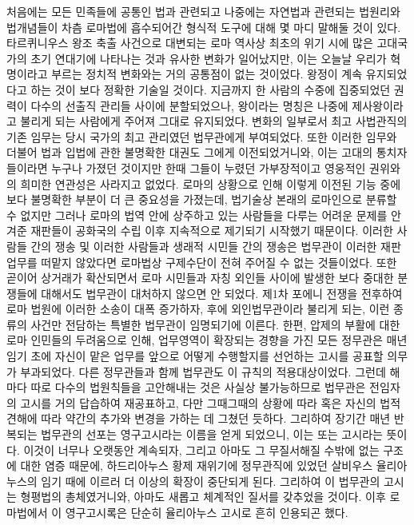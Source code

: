 처음에는 모든 민족들에 공통인 법과 관련되고 나중에는 자연법과 관련되는
법원리와 법개념들이 차츰 로마법에 흡수되어간 형식적 도구에 대해
몇 마디 말해둘 것이 있다.
타르퀴니우스 왕조 축출 사건으로 대변되는 로마 역사상 최초의 위기 시에
많은 고대국가의 초기 연대기에 나타나는 것과 유사한 변화가 일어났지만,
이는 오늘날 우리가 혁명이라고 부르는 정치적 변화와는 거의 공통점이 없는
것이었다.
왕정이 계속 유지되었다고 하는 것이 보다 정확한 기술일 것이다.
지금까지 한 사람의 수중에 집중되었던 권력이
다수의 선출직 관리들 사이에 분할되었으나,
왕이라는 명칭은 나중에
제사왕이라고
불리게 되는 사람에게 주어져 그대로 유지되었다.
변화의 일부로서 최고 사법관직의 기존 임무는 당시 국가의 최고 관리였던
법무관에게 부여되었다. 또한
이러한 임무와 더불어
법과 입법에 관한 불명확한 대권도 그에게 이전되었거니와,
이는 고대의 통치자들이라면 누구나 가졌던 것이지만
한때 그들이 누렸던 가부장적이고 영웅적인 권위와의 희미한 연관성은
사라지고 없었다.
로마의 상황으로 인해 이렇게 이전된 기능 중에 보다 불명확한 부분이
더 큰 중요성을 가졌는데,
법기술상 본래의 로마인으로 분류할 수 없지만
그러나 로마의 법역 안에 상주하고 있는 사람들을 다루는 어려운 문제를
안겨준 재판들이
공화국의 수립 이후
지속적으로 제기되기 시작했기 때문이다.
이러한 사람들 간의 쟁송 및 이러한 사람들과 생래적 시민들 간의 쟁송은
법무관이 이러한 재판업무를 떠맡지 않았다면
로마법상 구제수단이 전혀 주어질 수 없는 것들이었다.
또한 곧이어 상거래가 확산되면서 로마 시민들과 자칭 외인들 사이에 발생한
보다 중대한 분쟁들에 대해서도 법무관이 대처하지 않으면 안 되었다.
제1차 포에니 전쟁을 전후하여 로마 법원에 이러한 소송이 대폭 증가하자,
후에 외인법무관이라 불리게 되는,
이런 종류의 사건만 전담하는 특별한 법무관이 임명되기에 이른다.
한편, 압제의 부활에 대한 로마 인민들의 두려움으로 인해,
업무영역이 확장되는 경향을 가진 모든 정무관은
매년 임기 초에
자신이 맡은 업무를 앞으로 어떻게 수행할지를 선언하는
고시를 공표할 의무가 부과되었다.
다른 정무관들과 함께 법무관도 이 규칙의 적용대상이었다.
그런데 해마다 따로 다수의 법원칙들을 고안해내는 것은 사실상 불가능하므로
법무관은 전임자의 고시를 거의 답습하여 재공표하고,
다만 그때그때의 상황에 따라 혹은 자신의 법적 견해에 따라
약간의 추가와 변경을 가하는 데 그쳤던 듯하다.
그리하여 장기간 매년 반복되는 법무관의 선포는
영구고시라는 이름을 얻게 되었으니,
이는  또는  고시라는 뜻이다.
이것이 너무나 오랫동안 계속되자,
그리고 아마도 그 무질서해질 수밖에 없는 구조에 대한 염증 때문에,
하드리아누스 황제 재위기에 정무관직에 있었던
살비우스 율리아누스의 임기 때에 이르러
더 이상의 확장이 중단되게 된다.
그리하여 이 법무관의 고시는 형평법의 총체였거니와,
아마도 새롭고 체계적인 질서를 갖추었을 것이다.
이후 로마법에서 이 영구고시록은 단순히
율리아누스 고시로 흔히 인용되곤 했다.

